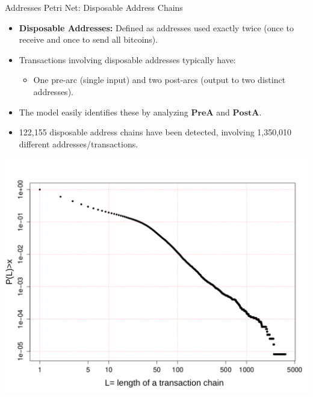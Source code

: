 \documentclass{beamer}
\begin{document}
\begin{frame}{Addresses Petri Net: Disposable Address Chains}
    \footnotesize
    \vspace{-0.2cm}

    \begin{itemize}
        \item \textbf{Disposable Addresses:} Defined as addresses used exactly twice (once to receive and once to send all bitcoins).
        \item Transactions involving disposable addresses typically have:
              \begin{itemize}
                  \item One pre-arc (single input) and two post-arcs (output to two distinct addresses).
              \end{itemize}
        \item The model easily identifies these by analyzing $\mathbf{PreA}$ and $\mathbf{PostA}$.
        \item 122,155 disposable address chains have been detected, involving 1,350,010 different addresses/transactions.
    \end{itemize}
    \vspace{-0.2cm}
    \centering
    \includegraphics[width=0.5\linewidth]{Chains}
    \label{fig_chains_CCDF}
\end{frame}
\end{document}
